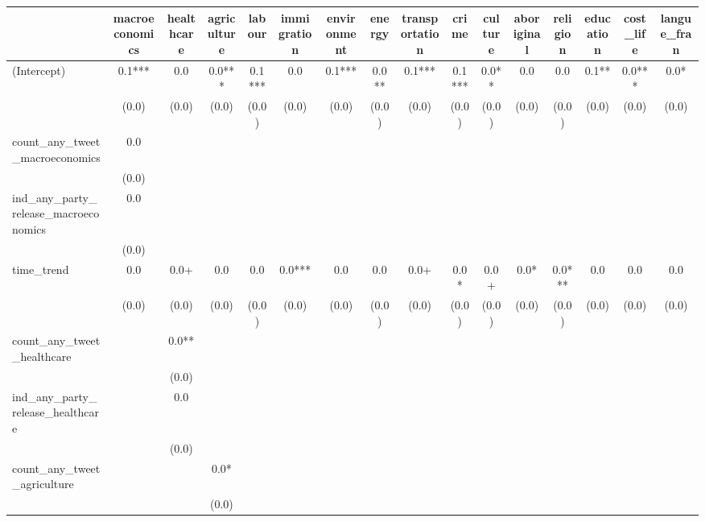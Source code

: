 \begin{table}
\centering
\begin{tabular}[t]{lccccccccccccccc}
\toprule
  & macroeconomics & healthcare & agriculture & labour & immigration & environment & energy & transportation & crime & culture & aboriginal & religion & education & cost\_life & langue\_fran\\
\midrule
(Intercept) & \num{0.1}*** & \num{0.0} & \num{0.0}*** & \num{0.1}*** & \num{0.0} & \num{0.1}*** & \num{0.0}** & \num{0.1}*** & \num{0.1}*** & \num{0.0}** & \num{0.0} & \num{0.0} & \num{0.1}** & \num{0.0}*** & \num{0.0}*\\
 & (\num{0.0}) & (\num{0.0}) & (\num{0.0}) & (\num{0.0}) & (\num{0.0}) & (\num{0.0}) & (\num{0.0}) & (\num{0.0}) & (\num{0.0}) & (\num{0.0}) & (\num{0.0}) & (\num{0.0}) & (\num{0.0}) & (\num{0.0}) & \vphantom{1} (\num{0.0})\\
count\_any\_tweet\_macroeconomics & \num{0.0} &  &  &  &  &  &  &  &  &  &  &  &  &  & \\
 & (\num{0.0}) &  &  &  &  &  &  &  &  &  &  &  &  &  \vphantom{1} & \\
ind\_any\_party\_release\_macroeconomics & \num{0.0} &  &  &  &  &  &  &  &  &  &  &  &  &  & \\
 & (\num{0.0}) &  &  &  &  &  &  &  &  &  &  &  &  &  & \\
time\_trend & \num{0.0} & \num{0.0}+ & \num{0.0} & \num{0.0} & \num{0.0}*** & \num{0.0} & \num{0.0} & \num{0.0}+ & \num{0.0}* & \num{0.0}+ & \num{0.0}* & \num{0.0}*** & \num{0.0} & \num{0.0} & \num{0.0}\\
 & (\num{0.0}) & (\num{0.0}) & (\num{0.0}) & (\num{0.0}) & (\num{0.0}) & (\num{0.0}) & (\num{0.0}) & (\num{0.0}) & (\num{0.0}) & (\num{0.0}) & (\num{0.0}) & (\num{0.0}) & (\num{0.0}) & (\num{0.0}) & (\num{0.0})\\
count\_any\_tweet\_healthcare &  & \num{0.0}** &  &  &  &  &  &  &  &  &  &  &  &  & \\
 &  & (\num{0.0}) &  &  &  &  &  &  &  &  &  &  &  &  \vphantom{1} & \\
ind\_any\_party\_release\_healthcare &  & \num{0.0} &  &  &  &  &  &  &  &  &  &  &  &  & \\
 &  & (\num{0.0}) &  &  &  &  &  &  &  &  &  &  &  &  & \\
count\_any\_tweet\_agriculture &  &  & \num{0.0}* &  &  &  &  &  &  &  &  &  &  &  & \\
 &  &  & (\num{0.0}) &  &  &  &  &  &  &  &  &  &  &  \vphantom{1} & \\

\end{tabular}
\end{table}
